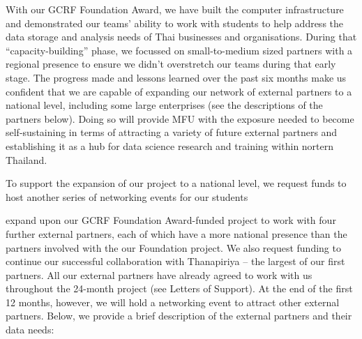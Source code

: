 \documentclass[11pt]{article}
\begin{document}
  \vspace{2mm}
  \noindent
  With our GCRF Foundation Award, we have built the computer infrastructure and demonstrated our teams' ability to work with students to help address the data storage and analysis needs of Thai businesses and organisations. During that ``capacity-building'' phase, we focussed on small-to-medium sized partners with a regional presence to ensure we didn't overstretch our teams during that early stage. The progress made and lessons learned over the past six months make us confident that we are capable of expanding our network of external partners to a national level, including some large enterprises (see the descriptions of the partners below). Doing so will provide MFU with the exposure needed to become self-sustaining in terms of attracting a variety of future external partners and establishing it as a hub for data science research and training within nortern Thailand.

  \vspace{2mm}
  \noindent
  To support the expansion of our project to a national level, we request funds to host another series of networking events for our students 
  
  expand upon our GCRF Foundation Award-funded project to work with four further external partners, each of which have a more national presence than the partners involved with the our Foundation project. We also request funding to continue our successful collaboration with Thanapiriya -- the largest of our first partners. All our external partners have already agreed to work with us throughout the 24-month project (see Letters of Support). At the end of the first 12 months, however, we will hold a networking event to attract other external partners. Below, we provide a brief description of the external partners and their data needs:
  
\end{document}
